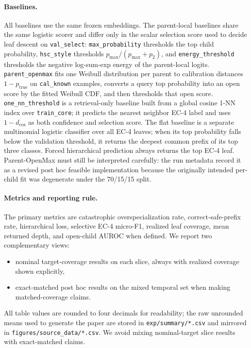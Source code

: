 \documentclass{article}
\begin{document}
\paragraph{Baselines.}
All baselines use the same frozen embeddings. The parent-local baselines share the same logistic scorer and differ only in the scalar selection score used to decide leaf descent on \texttt{val\_select}: \texttt{max\_probability} thresholds the top child probability, \texttt{hsc\_style} thresholds $p_{\max}/(p_{\max}+p_{2})$, and \texttt{energy\_threshold} thresholds the negative log-sum-exp energy of the parent-local logits. \texttt{parent\_openmax} fits one Weibull distribution per parent to calibration distances $1-p_{\mathrm{true}}$ on \texttt{cal\_known} examples, converts a query top probability into an open score by the fitted Weibull CDF, and then thresholds that open score. \texttt{one\_nn\_threshold} is a retrieval-only baseline built from a global cosine 1-NN index over \texttt{train\_core}; it predicts the nearest neighbor EC-4 label and uses $1-d_{\cos}$ as both confidence and selection score. The flat baseline is a separate multinomial logistic classifier over all EC-4 leaves; when its top probability falls below the validation threshold, it returns the deepest common prefix of its top three classes. Forced hierarchical prediction always returns the top EC-4 leaf. Parent-OpenMax must still be interpreted carefully: the run metadata record it as a revised post hoc feasible implementation because the originally intended per-child fit was degenerate under the 70/15/15 split.

\paragraph{Metrics and reporting rule.}
The primary metrics are catastrophic overspecialization rate, correct-safe-prefix rate, hierarchical loss, selective EC-4 micro-F1, realized leaf coverage, mean returned depth, and open-child AUROC when defined. We report two complementary views:
\begin{itemize}
\item nominal target-coverage results on each slice, always with realized coverage shown explicitly,
\item exact-matched post hoc results on the mixed temporal set when making matched-coverage claims.
\end{itemize}
All table values are rounded to four decimals for readability; the raw unrounded means used to generate the paper are stored in \texttt{exp/summary/*.csv} and mirrored in \texttt{figures/source\_data/*.csv}. We avoid mixing nominal-target slice results with exact-matched claims.
\end{document}
